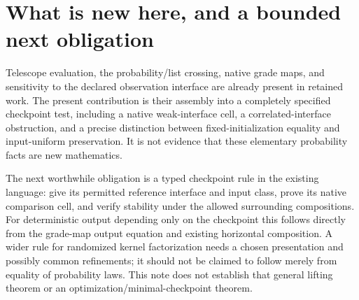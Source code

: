 \documentclass[11pt]{article}
\begin{document}
\section{What is new here, and a bounded next obligation}
Telescope evaluation, the probability/list crossing, native grade maps, and sensitivity to the declared observation interface are already present in retained work. The present contribution is their assembly into a completely specified checkpoint test, including a native weak-interface cell, a correlated-interface obstruction, and a precise distinction between fixed-initialization equality and input-uniform preservation. It is not evidence that these elementary probability facts are new mathematics.

The next worthwhile obligation is a typed checkpoint rule in the existing language: give its permitted reference interface and input class, prove its native comparison cell, and verify stability under the allowed surrounding compositions. For deterministic output depending only on the checkpoint this follows directly from the grade-map output equation and existing horizontal composition. A wider rule for randomized kernel factorization needs a chosen presentation and possibly common refinements; it should not be claimed to follow merely from equality of probability laws. This note does not establish that general lifting theorem or an optimization/minimal-checkpoint theorem.
\end{document}
